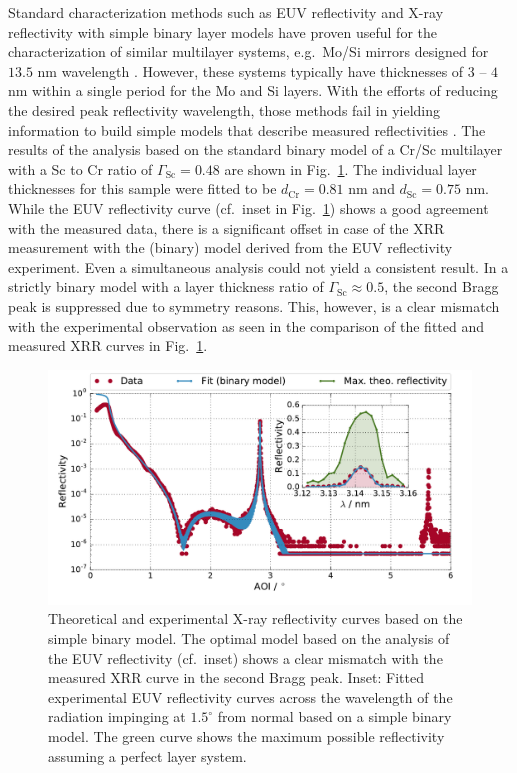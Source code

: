 Standard characterization methods such as EUV reflectivity and X-ray reflectivity with simple binary layer models have proven useful for the characterization of similar multilayer systems, e.g.~Mo/Si mirrors designed for $13.5$ nm wavelength \cite{Lim2001, bajt_mosi_crstallization, braun_mosi_different_barrier_layers}. However, these systems typically have thicknesses of $3$ -- $4$ nm within a single period for the Mo and Si layers. With the efforts of reducing the desired peak reflectivity wavelength, those methods fail in yielding information to build simple models that describe measured reflectivities \cite{Yakunin:14}. The results of the analysis based on the standard binary model of a Cr/Sc multilayer with a Sc to Cr ratio of $\Gamma_\text{Sc}=0.48$ are shown in Fig.~\ref{fig:EUV_XRR_reflectivity}. The individual layer thicknesses for this sample were fitted to be $d_\text{Cr} = 0.81$ nm and $d_\text{Sc}= 0.75$ nm. While the EUV reflectivity curve (cf.~inset in Fig.~\ref{fig:EUV_XRR_reflectivity}) shows 
a good agreement with the measured data, there is a significant offset in case of the XRR measurement with the (binary) model derived from the EUV reflectivity experiment. Even a simultaneous analysis could not yield a consistent result. In a strictly binary model with a layer thickness ratio of $\Gamma_\text{Sc}\approx 0.5$, the second Bragg peak is suppressed due to symmetry reasons. This, however, is a clear mismatch with the experimental observation as seen in the comparison of the fitted and measured XRR curves in Fig.~\ref{fig:EUV_XRR_reflectivity}.
\begin{figure}
  \centering
  \includegraphics[width=\textwidth]{img/im_cr_sc_multilayer/binary_model_and_theo_refl}
  \caption{Theoretical and experimental X-ray reflectivity curves based on the simple binary model. The optimal model based on the analysis of the EUV reflectivity (cf.~inset) shows a clear mismatch with the measured XRR curve in the second Bragg peak. Inset: Fitted experimental EUV reflectivity curves across the wavelength of the radiation impinging at $1.5^\circ$ from normal based on a simple binary model. The green curve shows the maximum possible reflectivity assuming a perfect layer system.
}
  \label{fig:EUV_XRR_reflectivity}
\end{figure}

